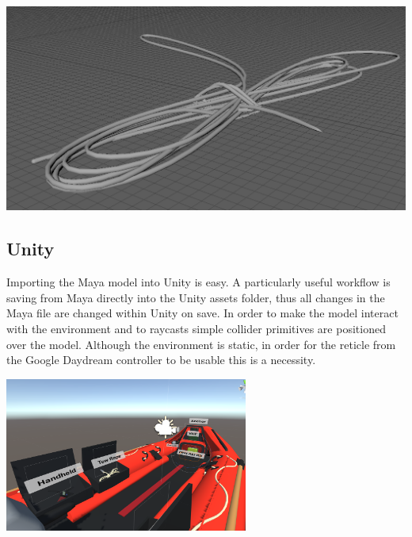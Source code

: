 \documentclass[ %
                    author={Elis Jones},
                supervisor={Dr. Kirsten Cater},
                    degree={BSc},
                     title={The Effect of Presentation Medium on Spatial Cognition},
                  subtitle={in the Virtual Environment},
                      year={2018} ]{dissertation}
\begin{document}
\begin{minipage}{\textwidth}
\begin{center}
\begin{minipage}{0.18\textwidth}
    \end{minipage}\hfill
    \begin{minipage}{0.18\textwidth}
        \centering
        \includegraphics[width=1\textwidth]{images/towdivisions.png}
    \end{minipage}\hfill
\end{center}
\label{tow}
\end{minipage}

\subsection{Unity}
Importing the Maya model into Unity is easy. A particularly useful workflow is saving from Maya directly into the Unity assets folder, thus all changes in the Maya file are changed within Unity on save. In order to make the model interact with the environment and to raycasts simple collider primitives are positioned over the model. Although the environment is static, in order for the reticle from the Google Daydream controller to be usable this is a necessity.  

\begin{minipage}{\textwidth}
\hfill \break
\centering
\includegraphics[width=0.6\textwidth]{images/model_unity}
\label{model}
\hfill \break
\end{minipage}
\end{document}
